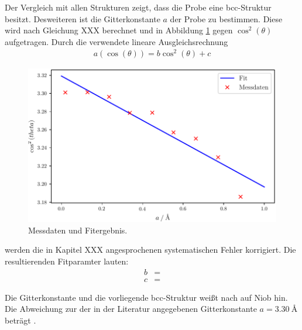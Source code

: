 

Der Vergleich mit allen Strukturen zeigt, dass die Probe eine bcc-Struktur besitzt.
Desweiteren ist die Gitterkonstante $a$ der Probe zu bestimmen. Diese wird nach Gleichung XXX berechnet und in Abbildung \ref{fig:plot1} gegen $\cos^2{(\theta)}$ aufgetragen. Durch die verwendete lineare Ausgleichsrechnung 
\begin{align}
	a(\cos{(\theta)})= b\cos^2{(\theta)} + c
\end{align}

\begin{figure}
  \centering
  \includegraphics{build/Metall.pdf}
  \caption{Messdaten und Fitergebnis.}
  \label{fig:plot1}
\end{figure}

werden die in Kapitel XXX angesprochenen systematischen Fehler korrigiert. Die resultierenden Fitparamter lauten:
\begin{align}
	b&=  \\
	c&=  
\end{align}

Die Gitterkonstante und die vorliegende bcc-Struktur weißt nach \cite{gitter} auf Niob hin. Die Abweichung zur der in der Literatur angegebenen Gitterkonstante 
$a=\SI{3.30}{\angstrom}$ beträgt $$.





